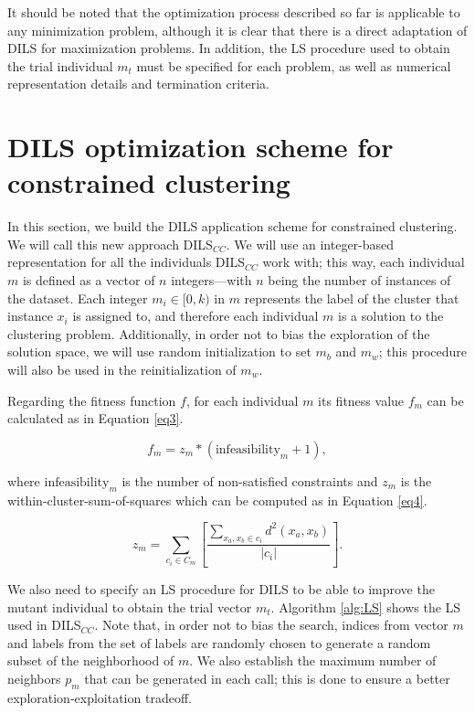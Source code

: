\documentclass[review]{elsarticle}
\begin{document}
It should be noted that the optimization process described so far is applicable to any minimization problem, although it is clear that there is a direct adaptation of DILS for maximization problems. In addition, the LS procedure used to obtain the trial individual $m_t$ must be specified for each problem, as well as numerical representation details and termination criteria.

\section{DILS optimization scheme for constrained clustering} \label{sec:DILS_CC}

In this section, we build the DILS application scheme for constrained clustering. We will call this new approach DILS$_{CC}$. We will use an integer-based representation for all the individuals DILS$_{CC}$ work with; this way, each individual $m$ is defined as a vector of $n$ integers---with $n$ being the number of instances of the dataset. Each integer $m_i \in [0,k)$ in $m$ represents the label of the cluster that instance $x_i$ is assigned to, and therefore each individual $m$ is a solution to the clustering problem. Additionally, in order not to bias the exploration of the solution space, we will use random initialization to set $m_b$ and $m_w$; this procedure will also be used in the reinitialization of $m_w$.

Regarding the fitness function $f$, for each individual $m$ its fitness value $f_m$ can be calculated as in Equation \ref{eq3}.

\begin{equation}
f_m = z_m * (\text{infeasibility}_m + 1),
\label{eq3}
\end{equation}

\noindent where $\text{infeasibility}_m$ is the number of non-satisfied constraints and $z_m$ is the within-cluster-sum-of-squares which can be computed as in Equation \eqref{eq4}.

\begin{equation}
z_m = \sum_{c_i \in C_m} \left[ \frac{\sum_{x_a, x_b \in c_i} d^2(x_a,x_b)}{|c_i|}\right].
\label{eq4}
\end{equation}

We also need to specify an LS procedure for DILS to be able to improve the mutant individual to obtain the trial vector $m_t$. Algorithm \ref{alg:LS} shows the LS used in DILS$_{CC}$. Note that, in order not to bias the search, indices from vector $m$ and labels from the set of labels are randomly chosen to generate a random subset of the neighborhood of $m$. We also establish the maximum number of neighbors $p_m$ that can be generated in each call; this is done to ensure a better exploration-exploitation tradeoff.
\end{document}
